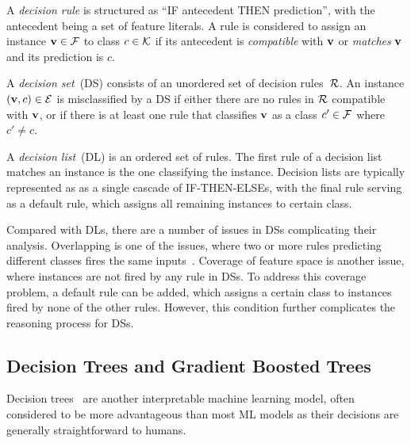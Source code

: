 A \emph{decision rule} is structured as ``IF antecedent THEN
prediction'', with the antecedent being a set of feature literals.
%
A rule is considered to assign an instance $\mathbf{v}\in{\mathcal{F}}$
to class $c\in{\mathcal{K}}$ if its antecedent is \emph{compatible} with
$\mathbf{v}$ or \emph{matches} $\mathbf{v}$ and its prediction is $c$.

A \emph{decision set}~(DS) consists of an unordered set 
of decision rules~${\mathcal{R}}$.
%
An instance $(\mathbf{v},c)\in{\mathcal{E}}$ is misclassified by a DS if either
there are no rules in ${\mathcal{R}}$ compatible with $\mathbf{v}$, or if there 
is at least one rule that classifies $\mathbf{v}$ as a class $c'\in{\mathcal{F}}$
where $c'\neq c$.

A \emph{decision list}~(DL) is an ordered set of rules. 
%
The first rule of a decision list matches an instance is the one classifying the instance.
%
Decision lists are typically represented as as a single cascade of 
IF-THEN-ELSEs, with the final rule serving as a default rule, 
which assigns all remaining instances to certain class.

Compared with DLs, there are a number of issues in DSs
complicating their analysis.
%
Overlapping is one of the issues, where two or more rules predicting
different classes fires the same inputs~\cite{ms-rw22,msi-fai23}. 
%
Coverage of feature space is another issue, where instances are not
fired by any rule in DSs.
%
To address this coverage problem, a default rule can be added, which 
assigns a certain class to instances fired by none of the other rules.
%
However, this condition further complicates the
reasoning process for DSs.

\subsection{Decision Trees and Gradient Boosted Trees}
Decision trees~\cite{rivest-ipl76,breiman-bk84,quinlan-bk93,quinlan-ml86}
are another interpretable machine learning model, often considered to be
more advantageous than most ML models as their decisions are generally
straightforward to humans.

